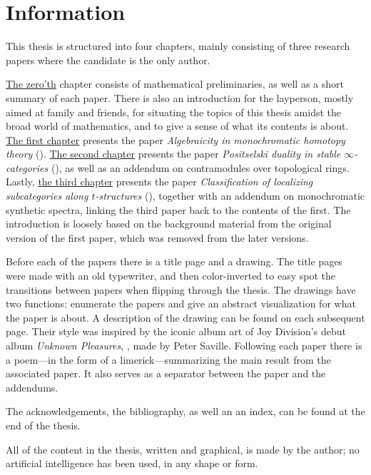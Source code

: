 
\section*{Information}

This thesis is structured into four chapters, mainly consisting of three research papers where the candidate is the only author.

\hyperref[ch0]{The zero'th} chapter consists of mathematical preliminaries, as well as a short summary of each paper. There is also an introduction for the layperson, mostly aimed at family and friends, for situating the topics of this thesis amidst the broad world of mathematics, and to give a sense of what its contents is about. \hyperref[ch1]{The first chapter} presents the paper \emph{Algebraicity in monochromatic homotopy theory} (\cite{aambo_2024_algebraicity}). \hyperref[ch2]{The second chapter} presents the paper \emph{Positselski duality in stable $\infty$-categories} (\cite{aambo_2024_positselski}), as well as an addendum on contramodules over topological rings. Lastly, \hyperref[ch3]{the third chapter} presents the paper \emph{Classification of localizing subcategories along $t$-structures} (\cite{aambo_2024_localizing}), together with an addendum on monochromatic synthetic spectra, linking the third paper back to the contents of the first. The introduction is loosely based on the background material from the original version of the first paper, which was removed from the later versions. 

Before each of the papers there is a title page and a drawing. The title pages were made with an old typewriter, and then color-inverted to easy spot the transitions between papers when flipping through the thesis. The drawings have two functions: enumerate the papers and give an abstract visualization for what the paper is about. A description of the drawing can be found on each subsequent page. Their style was inspired by the iconic album art of Joy Division's debut album \emph{Unknown Pleasures}, \cite{joy-division_79}, made by Peter Saville.  Following each paper there is a poem---in the form of a limerick---summarizing the main result from the associated paper. It also serves as a separator between the paper and the addendums. 

The acknowledgements, the bibliography, as well an an index, can be found at the end of the thesis. 

All of the content in the thesis, written and graphical, is made by the author; no artificial intelligence has been used, in any shape or form. 